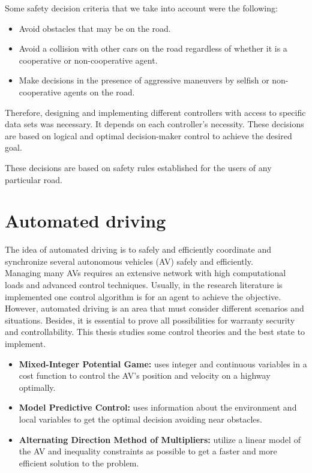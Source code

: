 Some safety decision criteria that we take into account were the following:
\begin{itemize}
\item Avoid obstacles that may be on the road.
\item Avoid a collision with other cars on the road regardless of whether it is a cooperative or non-cooperative agent.
\item Make decisions in the presence of aggressive maneuvers by selfish or non-cooperative agents on the road.

\end{itemize}


Therefore, designing and implementing different controllers with access to specific data sets was necessary. It depends on each controller's necessity. These decisions are based on logical and optimal decision-maker control to achieve the desired goal.

 These decisions are based on safety rules established for the users of any particular road.


\section{Automated driving}
The idea of automated driving is to safely and efficiently coordinate and synchronize several autonomous vehicles (AV) safely and efficiently.\\

Managing many AVs requires an extensive network with high computational loads and advanced control techniques. Usually, in the research literature is implemented one control algorithm is for an agent to achieve the objective. However, automated driving is an area that must consider different scenarios and situations. Besides, it is essential to prove all possibilities for warranty security and controllability. This thesis studies some control theories and the best state to implement.

\begin{itemize}
    \item  \textbf{Mixed-Integer Potential Game:} uses integer and continuous variables in a cost function to control the AV's position and velocity on a highway optimally.
    \item  \textbf{Model Predictive Control:} uses information about the environment and local variables to get the optimal decision avoiding near obstacles.
    \item  \textbf{Alternating Direction Method of Multipliers:} utilize a linear model of the AV and inequality constraints as possible to get a faster and more efficient solution to the problem. 
\end{itemize}

